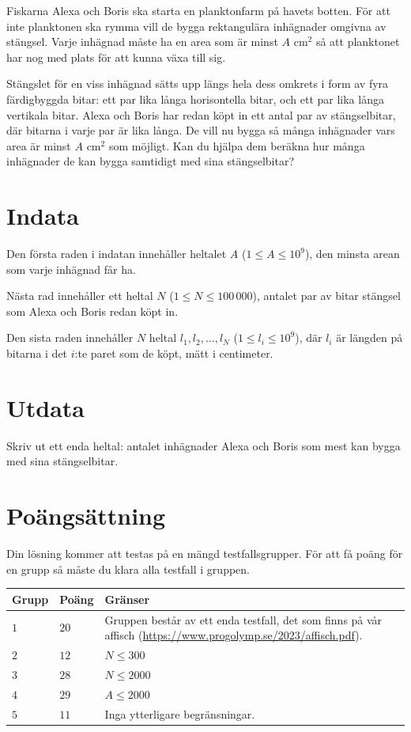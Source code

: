 Fiskarna Alexa och Boris ska starta en planktonfarm på havets botten.
För att inte planktonen ska rymma vill de bygga rektangulära inhägnader omgivna av stängsel.
Varje inhägnad måste ha en area som är minst $A \text{ cm}^2$ så att planktonet har nog med plats för att kunna växa till sig.

Stängslet för en viss inhägnad sätts upp längs hela dess omkrets i form av fyra färdigbyggda bitar: ett par lika långa horisontella bitar, och ett par lika långa vertikala bitar.
Alexa och Boris har redan köpt in ett antal par av stängselbitar, där bitarna i varje par är lika långa.
De vill nu bygga så många inhägnader vars area är minst $A \text{ cm}^2$ som möjligt.
Kan du hjälpa dem beräkna hur många inhägnader de kan bygga samtidigt med sina stängselbitar?

\section*{Indata}
Den första raden i indatan innehåller heltalet $A$ ($1 \le A \le 10^9$), den minsta arean som varje inhägnad får ha.

Nästa rad innehåller ett heltal $N$ ($1 \le N \le 100\,000$), antalet par av bitar stängsel som Alexa och Boris redan köpt in.

Den sista raden innehåller $N$ heltal $l_1, l_2, \dots, l_N$ ($1 \le l_i \le 10^9$), där $l_i$ är längden på bitarna i det $i$:te paret som de köpt, mätt i centimeter.
 
\section*{Utdata}
Skriv ut ett enda heltal: antalet inhägnader Alexa och Boris som mest kan bygga med sina stängselbitar.

\section*{Poängsättning}
Din lösning kommer att testas på en mängd testfallsgrupper.
För att få poäng för en grupp så måste du klara alla testfall i gruppen.

\noindent
\begin{tabular}{| l | l | p{12cm} |}
  \hline
  \textbf{Grupp} & \textbf{Poäng} & \textbf{Gränser} \\ \hline
  $1$    & $20$      & Gruppen består av ett enda testfall, det som finns på vår affisch (\url{https://www.progolymp.se/2023/affisch.pdf}). \\ \hline
  $2$    & $12$       & $N \le 300$ \\ \hline
  $3$    & $28$       & $N \le 2000$ \\ \hline
  $4$    & $29$       & $A \le 2000$ \\ \hline
  $5$    & $11$       & Inga ytterligare begränsningar. \\ \hline
\end{tabular}

